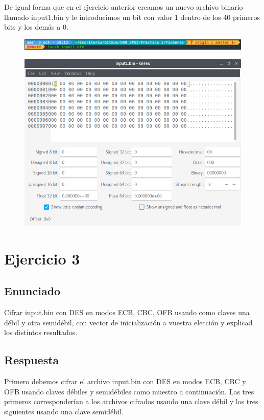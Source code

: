 \documentclass[10pt,a4paper,spanish]{report}
\begin{document}
\noindent
De igual forma que en el ejercicio anterior creamos un nuevo archivo binario llamado input1.bin y le introducimos un bit con valor 1 dentro de los 40 primeros bits y los demás a 0.

\begin{figure}[!hbp]
 \centering  \includegraphics[width=1\textwidth]{./Imagenes/3.png}
\end{figure}

\begin{figure}[!hbp]
 \centering  \includegraphics[width=1\textwidth]{./Imagenes/4.png}
\end{figure}


\chapter{Ejercicio 3}

\section{Enunciado}
\noindent
Cifrar input.bin con DES en modos ECB, CBC, OFB usando como claves una débil y otra semidébil, con vector de inicialización a vuestra elección y explicad los distintos resultados.

\section{Respuesta}
\noindent
Primero debemos cifrar el archivo input.bin con DES en modos ECB, CBC y OFB usando claves débiles y semidébiles como muestro a continuación. Las tres primeros corresponderían a los archivos cifrados usando una clave débil y los tres siguientes usando una clave semidébil.
\end{document}
